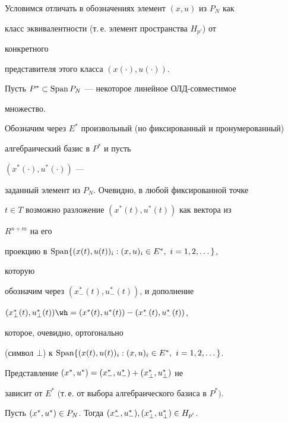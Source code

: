  


Условимся отличать в обозначениях элемент $(x,u)$ из $P_N$ как 


класс эквивалентности (т.\,е. элемент пространства $H_{p'}$) от 


конкретного 


представителя этого класса $(x(\cdot),u(\cdot))$. 


 


Пусть $P^*\subset\operatorname{Span} P_N$ --- некоторое линейное ОЛД-совместимое 


множество. 


Обозначим через $E^*$ произвольный (но фиксированный и пронумерованный)


алгебраический базис в $P^*$ и пусть 


$(x^*(\cdot),u^*(\cdot))$ --- 


заданный элемент из $P_N$. Очевидно, в любой фиксированной точке 


$t\in T$ возможно разложение $(x^*(t),u^*(t))$ как вектора из 


$R^{n+m}$ на его 


проекцию в $\operatorname{Span}\{(x(t),u(t))_i:(x,u)_i\in E^*,\ i=1,2,\dotsc\}$, 


которую 


обозначим через $(x^*_-(t),u^*_-(t))$, и дополнение 


$(x^*_\bot(t),u^*_\bot(t))\wh =(x^*(t),\linebreak


u^*(t))-(x^*_-(t),u^*_-(t))$, 


которое, очевидно, ортогонально 


(символ $\bot$) к $\Span\{(x(t),u(t))_i:(x,u)_i\in E^*,\ 


i=1,2,\dotsc\}$. 


 


\begin{lem} 


Представление ${(x^*_{},u^*_{})}={(x^*_{-},u^*_{-})}+{(x^*_{\bot},u^*_{\bot})}$ не 


зависит от $E^*$ $($т.\,е. от выбора алгебраического базиса в $P^*)$. 


\end{lem} 


 


\begin{lem} 


Пусть ${(x^*_{},u^*_{})}\in P_N$. Тогда ${(x^*_{-},u^*_{-})},{(x^*_{\bot},u^*_{\bot})}\in H_{p'}$. 


\end{lem} 


